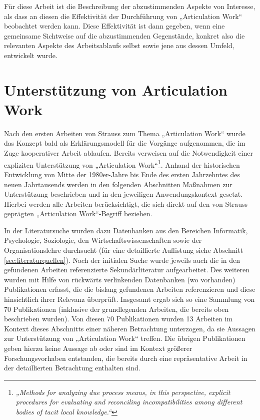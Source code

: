 Für diese Arbeit ist die Beschreibung der abzustimmenden Aspekte von Interesse, als dass an diesen die Effektivität der Durchführung von „Articulation Work“ beobachtet werden kann. Diese Effektivität ist dann gegeben, wenn eine gemeinsame Sichtweise auf die abzustimmenden Gegenstände, konkret also die relevanten Aspekte des Arbeitsablaufs selbst sowie jene aus dessen Umfeld, entwickelt wurde.


\section{Unterstützung von Articulation Work} %
\label{sec:unterstützung_von_articulation_work}

Nach den ersten Arbeiten von Strauss zum Thema „Articulation Work“ wurde das Konzept bald als Erklärungsmodell für die Vorgänge aufgenommen, die im Zuge kooperativer Arbeit ablaufen. Bereits \citeyear{Gerson86} verweisen \citeauthor{Gerson86} auf die Notwendigkeit einer expliziten Unterstützung von „Articulation Work“\footnote{\emph{„Methods for analyzing 
due process means, in this perspective, explicit procedures for evaluating and reconciling incompatibilities among different bodies of tacit local knowledge.“}\citep[][S. 266]{Gerson86}}. Anhand der historischen Entwicklung von Mitte der 1980er-Jahre bis Ende des ersten Jahrzehntes des neuen Jahrtausends werden in den folgenden Abschnitten Maßnahmen zur Unterstützung beschrieben und in den jeweiligen Anwendungskontext gesetzt. Hierbei werden alle Arbeiten berücksichtigt, die sich direkt auf den von Strauss geprägten „Articulation Work“-Begriff beziehen. 

In der Literatursuche wurden dazu Datenbanken aus den Bereichen Informatik, Psychologie, Soziologie, den Wirtschaftswissenschaften sowie der Organisationslehre durchsucht (für eine detaillierte Auflistung siehe Abschnitt \ref{sec:literaturquellen}). Nach der initialen Suche wurde jeweils auch die in den gefundenen Arbeiten referenzierte Sekundärliteratur aufgearbeitet. Des weiteren wurden mit Hilfe von rückwärts verlinkenden Datenbanken (wo vorhanden) Publikationen erfasst, die die bislang gefundenen Arbeiten referenzieren und diese hinsichtlich ihrer Relevanz überprüft. Insgesamt ergab sich so eine Sammlung von 70 Publikationen (inklusive der grundlegenden Arbeiten, die bereits oben beschrieben wurden). Von diesen 70 Publikationen wurden 13 Arbeiten im Kontext dieses Abschnitts einer näheren Betrachtung unterzogen, da sie Aussagen zur Unterstützung von „Articulation Work“ treffen. Die übrigen Publikationen geben hierzu keine Aussage ab oder sind im Kontext größerer Forschungsvorhaben entstanden, die bereits durch eine repräsentative Arbeit in der detaillierten Betrachtung enthalten sind. 

